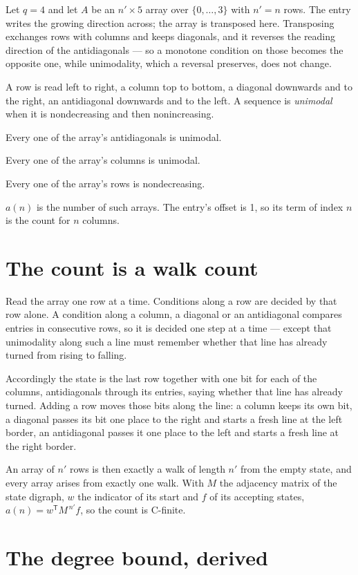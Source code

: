 \documentclass[11pt]{article}
\theoremstyle{definition}
\begin{document}
Let $q = 4$ and let $A$ be an $n' \times 5$ array over $\{0,\dots,3\}$ with $n' = n$ rows. The entry writes the growing direction across; the array is transposed here. Transposing exchanges rows with columns and keeps diagonals, and it reverses the reading direction of the antidiagonals --- so a monotone condition on those becomes the opposite one, while unimodality, which a reversal preserves, does not change.

A row is read left to right, a column top to bottom, a diagonal downwards and to the right, an antidiagonal downwards and to the left. A sequence is {\itshape unimodal} when it is nondecreasing and then nonincreasing.

Every one of the array's antidiagonals is unimodal.

Every one of the array's columns is unimodal.

Every one of the array's rows is nondecreasing.

$a(n)$ is the number of such arrays. The entry's offset is 1, so its term of index $n$ is the count for $n$ columns.

\section{The count is a walk count}

Read the array one row at a time. Conditions along a row are decided by that row alone. A condition along a column, a diagonal or an antidiagonal compares entries in consecutive rows, so it is decided one step at a time --- except that unimodality along such a line must remember whether that line has already turned from rising to falling.

Accordingly the state is the last row together with one bit for each of the columns, antidiagonals through its entries, saying whether that line has already turned. Adding a row moves those bits along the line: a column keeps its own bit, a diagonal passes its bit one place to the right and starts a fresh line at the left border, an antidiagonal passes it one place to the left and starts a fresh line at the right border.

An array of $n'$ rows is then exactly a walk of length $n'$ from the empty state, and every array arises from exactly one walk. With $M$ the adjacency matrix of the state digraph, $w$ the indicator of its start and $f$ of its accepting states, $a(n) = w^{\mathsf T}M^{\,n'}f$, so the count is C-finite.

\section{The degree bound, derived}
\end{document}
